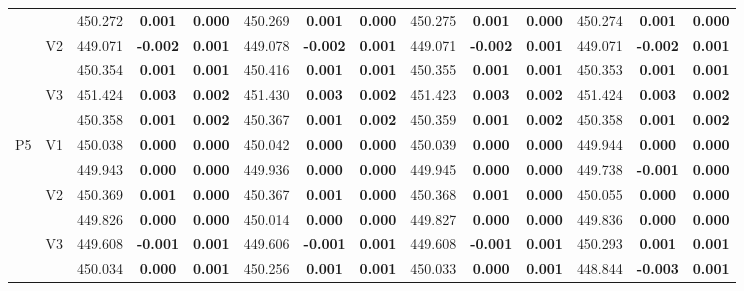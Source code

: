 \documentclass[11pt,a4paper]{article}
\begin{document}
{\begin{sidewaystable}[H]
{{\begin{tabular}{cc|ccc|ccc|ccc|ccc|}
   &  & 450.272 & \textbf{0.001} & \textbf{0.000} & 450.269 & \textbf{0.001} & \textbf{0.000} & 450.275 & \textbf{0.001} & \textbf{0.000} & 450.274 & \textbf{0.001} & \textbf{0.000} \\ 
   & \multirow{2}{*}{V2} & 449.071 & \textbf{-0.002} & \textbf{0.001} & 449.078 & \textbf{-0.002} & \textbf{0.001} & 449.071 & \textbf{-0.002} & \textbf{0.001} & 449.071 & \textbf{-0.002} & \textbf{0.001} \\ 
   &  & 450.354 & \textbf{0.001} & \textbf{0.001} & 450.416 & \textbf{0.001} & \textbf{0.001} & 450.355 & \textbf{0.001} & \textbf{0.001} & 450.353 & \textbf{0.001} & \textbf{0.001} \\ 
   & \multirow{2}{*}{V3} & 451.424 & \textbf{0.003} & \textbf{0.002} & 451.430 & \textbf{0.003} & \textbf{0.002} & 451.423 & \textbf{0.003} & \textbf{0.002} & 451.424 & \textbf{0.003} & \textbf{0.002} \\ 
   &  & 450.358 & \textbf{0.001} & \textbf{0.002} & 450.367 & \textbf{0.001} & \textbf{0.002} & 450.359 & \textbf{0.001} & \textbf{0.002} & 450.358 & \textbf{0.001} & \textbf{0.002} \\ 
   \hline \hline\multirow{6}{*}{P5} & \multirow{2}{*}{V1} & 450.038 & \textbf{0.000} & \textbf{0.000} & 450.042 & \textbf{0.000} & \textbf{0.000} & 450.039 & \textbf{0.000} & \textbf{0.000} & 449.944 & \textbf{0.000} & \textbf{0.000} \\ 
   &  & 449.943 & \textbf{0.000} & \textbf{0.000} & 449.936 & \textbf{0.000} & \textbf{0.000} & 449.945 & \textbf{0.000} & \textbf{0.000} & 449.738 & \textbf{-0.001} & \textbf{0.000} \\ 
   & \multirow{2}{*}{V2} & 450.369 & \textbf{0.001} & \textbf{0.000} & 450.367 & \textbf{0.001} & \textbf{0.000} & 450.368 & \textbf{0.001} & \textbf{0.000} & 450.055 & \textbf{0.000} & \textbf{0.000} \\ 
   &  & 449.826 & \textbf{0.000} & \textbf{0.000} & 450.014 & \textbf{0.000} & \textbf{0.000} & 449.827 & \textbf{0.000} & \textbf{0.000} & 449.836 & \textbf{0.000} & \textbf{0.000} \\ 
   & \multirow{2}{*}{V3} & 449.608 & \textbf{-0.001} & \textbf{0.001} & 449.606 & \textbf{-0.001} & \textbf{0.001} & 449.608 & \textbf{-0.001} & \textbf{0.001} & 450.293 & \textbf{0.001} & \textbf{0.001} \\ 
   &  & 450.034 & \textbf{0.000} & \textbf{0.001} & 450.256 & \textbf{0.001} & \textbf{0.001} & 450.033 & \textbf{0.000} & \textbf{0.001} & 448.844 & \textbf{-0.003} & \textbf{0.001} \\ 

\end{tabular}}}
\end{sidewaystable}}
\end{document}
